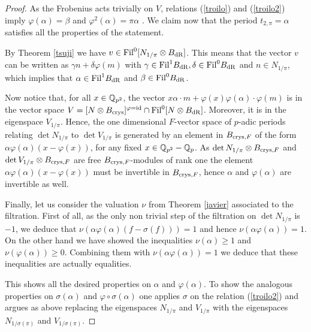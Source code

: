 \documentclass[11pt]{amsart}
\begin{document}
\begin{proof}
As the Frobenius acts trivially on $V$, relations (\ref{troilo}) and (\ref{troilo2}) imply $ \varphi(\alpha) = \beta$ and $ \varphi^2(\alpha) = \pi \alpha$ . We claim now that the period $t_{2,\pi}=\alpha$ satisfies all the properties of the statement. 

 By Theorem \ref{tsuji} we have $v\in \textnormal{Fil}^0[N_{1/\pi} \otimes B_{\mathrm{dR}}]$. This means that the vector $v$ can be written as $\gamma n + \delta \varphi(m)$ with $\gamma \in \textnormal{Fil}^{1}B_{\mathrm{dR}}, \delta \in \textnormal{Fil}^0B_{\mathrm{dR}}$ and $n \in N_{1/\pi}$, which implies that $\alpha \in \textnormal{Fil}^{1}B_{\mathrm{dR}}$ and  $\beta \in \textnormal{Fil}^{0}B_{\mathrm{dR}}$. 

Now notice that, for all $x\in \mathbb{Q}_{p^2}$, the vector $x\alpha \cdot m+ \varphi(x)\varphi(\alpha) \cdot \varphi(m)$ is in the vector space $V=[N\otimes B_{\textnormal{crys}}]^{\varphi=\mathrm{id}} \cap  \textnormal{Fil}^0[N \otimes B_{\mathrm{dR}}] $. 
Moreover, it is in the eigenspace $V_{1/\pi}$. 
Hence,  the one dimensional $F$-vector space of $p$-adic periods relating $\det N_{1/\pi}$ to $\det V_{1/\pi}$ is generated by an element in $B_{\textnormal{crys},F}$ of the form $\alpha \varphi(\alpha) (x-\varphi( x) )$, for any fixed $x \in \mathbb{Q}_{p^2} - \mathbb{Q}_p$. 
As $\det N_{1/\pi}\otimes B_{\textnormal{crys},F}$ and $\det V_{1/\pi}\otimes B_{\textnormal{crys},F}$ are free $B_{\textnormal{crys},F}$-modules of rank one the element $\alpha \varphi(\alpha) (x-\varphi( x) )$ must be invertible in $B_{\textnormal{crys},F}$, hence $\alpha$ and  $\varphi(\alpha)$ are invertible as well.
 
 Finally, let us  consider the valuation $\nu$ from Theorem \ref{javier} associated  to the filtration. 
 First of all, as the only non trivial step of the filtration on $\det N_{1/\pi}$ is  $-1$, we deduce that $\nu ( \alpha \varphi(\alpha) (f-\sigma( f) ))=1$ and hence $\nu ( \alpha \varphi(\alpha))=1$. 
 On the other hand we have showed the inequalities $\nu ( \alpha) \geq 1$ and  $\nu (  \varphi(\alpha))\geq 0$. 
 Combining them with $\nu ( \alpha \varphi(\alpha)  )=1$ we deduce that these inequalities are actually equalities.
 
 This shows all the desired properties on $\alpha$ and $ \varphi(\alpha)$. 
 To show the analogous properties on $\sigma (\alpha)$ and $ \varphi \circ \sigma (\alpha)$ one applies $\sigma$ on the relation (\ref{troilo2}) and argues as above replacing the eigenspaces $N_{1/\pi}$ and $V_{1/\pi}$ with the eigenspaces $N_{1/\sigma(\pi)}$  and $V_{1/\sigma(\pi)}$.
\end{proof}
\end{document}
